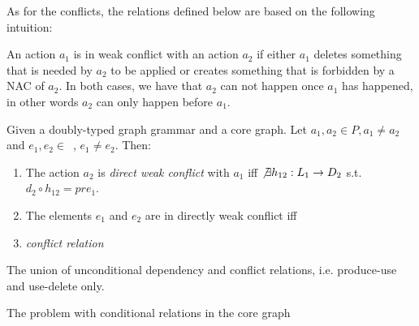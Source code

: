 As for the conflicts, the relations defined below are based on the following intuition: 

\begin{intuition} An action $a_1$ is in weak conflict with an action $a_2$ if either $a_1$ deletes something that is needed by $a_2$ to be applied or creates something that is forbidden by a NAC of $a_2$. In both cases, we have that $a_2$ can not happen once $a_1$ has happened, in other words $a_2$ can only happen before $a_1$.
\end{intuition}


\begin{definition} Given \doublyTypedGraphGrammarCore{} a doubly-typed graph grammar and \coreGraph{} a core graph. Let $a_1, a_2 \in P, a_1 \ne a_2$ and \mbox{$e_1, e_2 \in $ \coreGraph{},} $e_1 \ne e_2$. Then: 

  \begin{enumerate}
    \item The action $a_2$ is \emph{direct weak conflict} with $a_1$ iff $\not\exists h_{12} : L_1 \rightarrow D_2$ s.t. \mbox{$d_2 \circ h_{12} = pre_1$}.

   \item The elements $e_1$ and $e_2$ are in directly weak conflict iff 
    \item \emph{conflict relation}
  \end{enumerate}
\end{definition}

\begin{definition} The union of unconditional dependency and conflict relations, i.e. produce-use and use-delete only.
\end{definition}

The problem with conditional relations in the core graph

